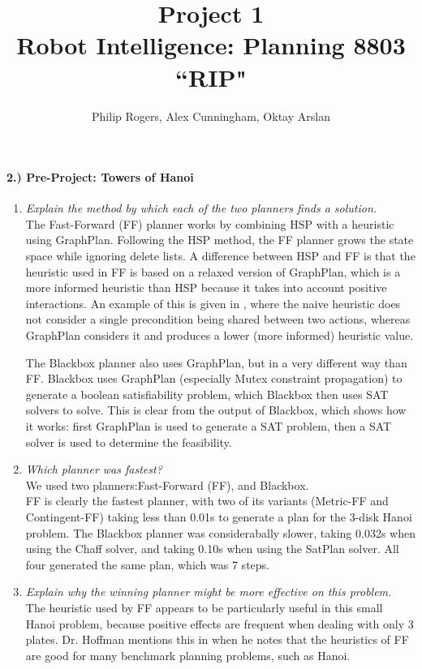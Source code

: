 \documentclass{article}
\begin{document}
\title{Project 1\\{\large{Robot Intelligence: Planning 8803 \textbf{``RIP"}}}}
\author{Philip Rogers, Alex Cunningham, Oktay Arslan}
\maketitle

\paragraph{2.) Pre-Project: Towers of Hanoi}
\begin{enumerate}
\item{\textit{Explain the method by which each of the two planners finds a solution.\\}}
The Fast-Forward (FF) planner works by combining HSP with a heuristic using GraphPlan. Following the HSP method, the FF planner grows the state space while ignoring delete lists.  A difference between HSP and FF is that the heuristic used in FF is based on a relaxed version of GraphPlan, which is a more informed heuristic than HSP because it takes into account positive interactions.  An example of this is given in \cite{hoffmann2001fast}, where the naive heuristic does not consider a single precondition being shared between two actions, whereas GraphPlan considers it and produces a lower (more informed) heuristic value.


The Blackbox planner also uses GraphPlan, but in a very different way than FF.  Blackbox uses GraphPlan (especially Mutex constraint propagation) to generate a boolean satisfiability problem, which Blackbox then uses SAT solvers to solve.  This is clear from the output of Blackbox, which shows how it works: first GraphPlan is used to generate a SAT problem, then a SAT solver is used to determine the feasibility.

\item{\textit{Which planner was fastest?\\}}
We used two planners:Fast-Forward (FF), and Blackbox.\\
FF is clearly the fastest planner, with two of its variants (Metric-FF and Contingent-FF) taking less than 0.01s to generate a plan for the 3-disk Hanoi problem.  The Blackbox planner was considerabally slower, taking 0.032s when using the Chaff solver, and taking 0.10s when using the SatPlan solver.  All four generated the same plan, which was 7 steps.

\item{\textit{Explain why the winning planner might be more effective on this problem.\\}}
The heuristic used by FF appears to be particularly useful in this small Hanoi problem, because positive effects are frequent when dealing with only 3 plates.  Dr. Hoffman mentions this in \cite{hoffmann2001fast} when he notes that the heuristics of FF are good for many benchmark planning problems, such as Hanoi.  
\end{enumerate}
\end{document}
